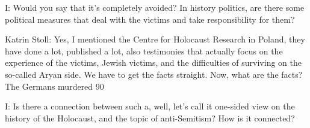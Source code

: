  

I: Would you say that it’s completely avoided? In history politics, are there some political measures that deal with the victims and take responsibility for them? 

 

Katrin Stoll: Yes, I mentioned the Centre for Holocaust Research in Poland, they have done a lot, published a lot, also testimonies that actually focus on the experience of the victims, Jewish victims, and the difficulties of surviving on the so-called Aryan side. We have to get the facts straight. Now, what are the facts? The Germans murdered 90%

 

I: Is there a connection between such a, well, let’s call it one-sided view on the history of the Holocaust, and the topic of anti-Semitism? How is it connected? 

 

